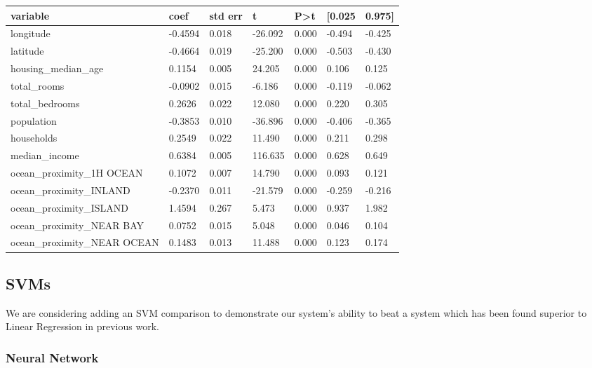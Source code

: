\documentclass[11pt]{article}
\begin{document}
\begin{table}[b]
\centering
\begin{tabular}{|l|l|l|l|l|l|l|} 
\hline
\textbf{variable} & \textbf{coef} & \textbf{std err} & \textbf{t} & \textbf{P\textgreater{}\textbar{}t\textbar{}} & \textbf{[0.025} & \textbf{0.975]} \\ 
\hline
longitude & -0.4594 & 0.018 & -26.092 & 0.000 & -0.494 & -0.425 \\ 
\hline
latitude & -0.4664 & 0.019 & -25.200 & 0.000 & -0.503 & -0.430 \\ 
\hline
housing\_median\_age & 0.1154 & 0.005 & 24.205 & 0.000 & 0.106 & 0.125 \\ 
\hline
total\_rooms & -0.0902 & 0.015 & -6.186 & 0.000 & -0.119 & -0.062 \\ 
\hline
total\_bedrooms & 0.2626 & 0.022 & 12.080 & 0.000 & 0.220 & 0.305 \\ 
\hline
population & -0.3853 & 0.010 & -36.896 & 0.000 & -0.406 & -0.365 \\ 
\hline
households & 0.2549 & 0.022 & 11.490 & 0.000 & 0.211 & 0.298 \\ 
\hline
median\_income & 0.6384 & 0.005 & 116.635 & 0.000 & 0.628 & 0.649 \\ 
\hline
ocean\_proximity\_1H OCEAN & 0.1072 & 0.007 & 14.790 & 0.000 & 0.093 & 0.121 \\ 
\hline
ocean\_proximity\_INLAND & -0.2370 & 0.011 & -21.579 & 0.000 & -0.259 & -0.216 \\ 
\hline
ocean\_proximity\_ISLAND & 1.4594 & 0.267 & 5.473 & 0.000 & 0.937 & 1.982 \\ 
\hline
ocean\_proximity\_NEAR BAY & 0.0752 & 0.015 & 5.048 & 0.000 & 0.046 & 0.104 \\ 
\hline
ocean\_proximity\_NEAR OCEAN & 0.1483 & 0.013 & 11.488 & 0.000 & 0.123 & 0.174 \\
\hline
\end{tabular}
\end{table}

\subsection{SVMs}

We are considering adding an SVM comparison to demonstrate our system's ability to beat a system which has been found superior to Linear Regression in previous work.

\subsubsection{Neural Network}
\end{document}
